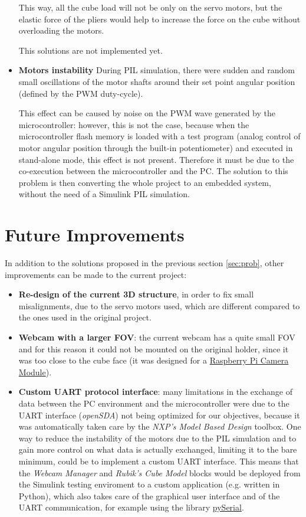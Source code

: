 \documentclass{report}
\begin{document}
\begin{itemize}
    This way, all the cube load will not be only on the servo motors, but the elastic force of the pliers would help to increase the force on the cube without overloading the motors.

    \bigskip
    This solutions are not implemented yet.

    \item \textbf{Motors instability}
    During PIL simulation, there were sudden and random small oscillations of the motor shafts around their set point angular position (defined by the PWM duty-cycle).
    
    This effect can be caused by noise on the PWM wave generated by the microcontroller: however, this is not the case, because when the microcontroller flash memory is loaded with a test program (analog control of motor angular position through the built-in potentiometer) and executed in stand-alone mode, this effect is not present. Therefore it must be due to the co-execution between the microcontroller and the PC. The solution to this problem is then converting the whole project to an embedded system, without the need of a Simulink PIL simulation.
\end{itemize}
\section{Future Improvements}
In addition to the solutions proposed in the previous section \ref{sec:prob}, other improvements can be made to the current project:
\begin{itemize}
    \item \textbf{Re-design of the current 3D structure}, in order to fix small misalignments, due to the servo motors used, which are different compared to the ones used in the original project.
    
    \item \textbf{Webcam with a larger FOV}: the current webcam has a quite small FOV and for this reason it could not be mounted on the original holder, since it was too close to the cube face (it was designed for a \href{https://www.raspberrypi.com/products/camera-module-v2/}{Raspberry Pi Camera Module}).

    \item \textbf{Custom UART protocol interface}: many limitations in the exchange of data between the PC environment and the microcontroller were due to the UART interface (\textit{openSDA}) not being optimized for our objectives, because it was automatically taken care by the \textit{NXP's Model Based Design} toolbox. One way to reduce the instability of the motors due to the PIL simulation and to gain more control on what data is actually exchanged, limiting it to the bare minimum, could be to implement a custom UART interface. This means that the \textit{Webcam Manager} and \textit{Rubik's Cube Model} blocks would be deployed from the Simulink testing enviroment to a custom application (e.g. written in Python), which also takes care of the graphical user interface and of the UART communication, for example using the library \href{https://pyserial.readthedocs.io/en/latest/}{pySerial}.
    
\end{itemize}
\end{document}
